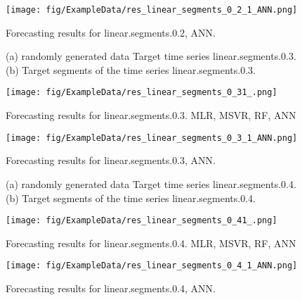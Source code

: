 \documentclass[12pt]{article}
\begin{document}
\begin{figure}
\centering
\texttt{[image: fig/ExampleData/res\_linear\_segments\_0\_2\_1\_ANN.png]}
\caption{Forecasting results for	linear.segments.0.2,	ANN.	}
\end{figure}


\begin{figure}
\centering
{}
\caption{(a)	randomly generated data	Target time series	linear.segments.0.3.		(b)		Target segments of the time series	linear.segments.0.3.		}
\end{figure}



\begin{figure}
\centering
\texttt{[image: fig/ExampleData/res\_linear\_segments\_0\_31\_.png]}
\caption{Forecasting results for	linear.segments.0.3.	MLR, MSVR, RF, ANN}
\end{figure}


\begin{figure}
\centering
\texttt{[image: fig/ExampleData/res\_linear\_segments\_0\_3\_1\_ANN.png]}
\caption{Forecasting results for	linear.segments.0.3,	ANN.	}
\end{figure}


\begin{figure}
\centering
{}
\caption{(a)	randomly generated data	Target time series	linear.segments.0.4.		(b)		Target segments of the time series	linear.segments.0.4.		}
\end{figure}



\begin{figure}
\centering
\texttt{[image: fig/ExampleData/res\_linear\_segments\_0\_41\_.png]}
\caption{Forecasting results for	linear.segments.0.4.	MLR, MSVR, RF, ANN}
\end{figure}


\begin{figure}
\centering
\texttt{[image: fig/ExampleData/res\_linear\_segments\_0\_4\_1\_ANN.png]}
\caption{Forecasting results for	linear.segments.0.4,	ANN.	}
\end{figure}
\end{document}
